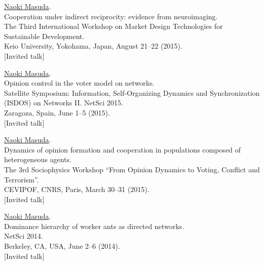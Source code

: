 \documentclass[11pt,letter]{article}
\begin{document}
\begin{etaremune}
\item \underline{Naoki Masuda}.\\
Cooperation under indirect reciprocity: evidence from neuroimaging.\\
The Third International Workshop on Market Design Technologies for Sustainable Development.\\
Keio University, Yokohama, Japan, August 21--22 (2015).\\
$[$Invited talk$]$


\item \underline{Naoki Masuda}.\\
Opinion control in the voter model on networks.\\
Satellite Symposium: Information, Self-Organizing Dynamics and Synchronization (ISDOS) on Networks II. NetSci 2015.\\
Zaragoza, Spain, June 1--5 (2015).\\
$[$Invited talk$]$

\item \underline{Naoki Masuda}.\\
Dynamics of opinion formation and cooperation in populations composed of heterogeneous agents.\\
The 3rd Sociophysics Workshop ``From Opinion Dynamics to Voting, Conflict and Terrorism''.\\
CEVIPOF, CNRS, Paris, March 30--31 (2015).\\
$[$Invited talk$]$

\item \underline{Naoki Masuda}.\\
Dominance hierarchy of worker ants as directed networks.\\
NetSci 2014.\\
Berkeley, CA, USA, June 2--6 (2014).\\
$[$Invited talk$]$


\end{etaremune}
\end{document}
